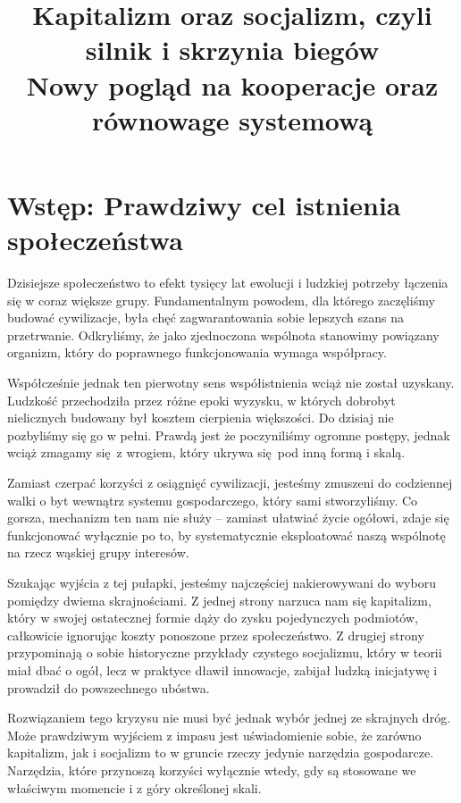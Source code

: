 \documentclass[12pt,a4paper]{article}
\title{\textbf{Kapitalizm oraz socjalizm, czyli silnik i skrzynia biegów}\\ \large Nowy pogląd na kooperacje oraz równowage systemową}
\author{}
\date{}
\begin{document}
\maketitle

\section*{Wstęp: Prawdziwy cel istnienia społeczeństwa}

Dzisiejsze społeczeństwo to efekt tysięcy lat ewolucji i ludzkiej potrzeby
łączenia się w coraz większe grupy. Fundamentalnym powodem, dla którego
zaczęliśmy budować cywilizacje, była chęć zagwarantowania sobie lepszych
szans na przetrwanie. Odkryliśmy, że jako zjednoczona wspólnota stanowimy
powiązany organizm, który do poprawnego funkcjonowania wymaga współpracy.

Współcześnie jednak ten pierwotny sens współistnienia wciąż nie został uzyskany. 
Ludzkość przechodziła przez różne epoki wyzysku, w których dobrobyt nielicznych budowany był kosztem cierpienia większości. Do dzisiaj nie pozbyliśmy się go w pełni. Prawdą jest że poczyniliśmy ogromne postępy, jednak wciąż zmagamy się z wrogiem, który ukrywa się pod inną formą i skalą.

Zamiast czerpać korzyści z osiągnięć cywilizacji, jesteśmy zmuszeni do codziennej
walki o byt wewnątrz systemu gospodarczego, który sami stworzyliśmy. Co
gorsza, mechanizm ten nam nie służy -- zamiast ułatwiać życie ogółowi,
zdaje się funkcjonować wyłącznie po to, by systematycznie eksploatować naszą
wspólnotę na rzecz wąskiej grupy interesów.

Szukając wyjścia z tej pułapki, jesteśmy najczęściej nakierowywani do wyboru pomiędzy dwiema skrajnościami. Z jednej strony narzuca nam się
kapitalizm, który w swojej ostatecznej formie dąży do zysku pojedynczych
podmiotów, całkowicie ignorując koszty ponoszone przez społeczeństwo. Z
drugiej strony przypominają o sobie historyczne przykłady czystego socjalizmu,
który w teorii miał dbać o ogół, lecz w praktyce dławił innowacje, zabijał
ludzką inicjatywę i prowadził do powszechnego ubóstwa.

Rozwiązaniem tego kryzysu nie musi być jednak  wybór jednej ze skrajnych
dróg. Może prawdziwym wyjściem z impasu jest uświadomienie sobie, że zarówno
kapitalizm, jak i socjalizm to w gruncie rzeczy jedynie narzędzia gospodarcze.
Narzędzia, które przynoszą korzyści wyłącznie wtedy, gdy są stosowane we
właściwym momencie i z góry określonej skali.
\end{document}
